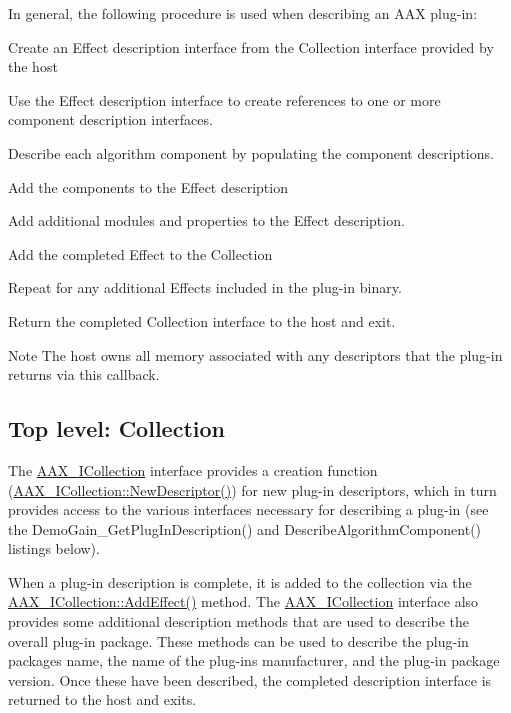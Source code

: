  In general, the following procedure is used when describing an A\+AX plug-\/in\+: 
\begin{DoxyEnumerate}
\item Create an Effect description interface from the Collection interface provided by the host  
\item Use the Effect description interface to create references to one or more component description interfaces.  
\item Describe each algorithm component by populating the component descriptions.  
\item Add the components to the Effect description 
\item Add additional modules and properties to the Effect description.  
\item Add the completed Effect to the Collection  
\item Repeat for any additional Effects included in the plug-\/in binary.  
\item Return the completed Collection interface to the host and exit.  
\end{DoxyEnumerate}

 \begin{DoxyNote}{Note}
The host owns all memory associated with any descriptors that the plug-\/in returns via this callback.
\end{DoxyNote}


 \hypertarget{a00796_describe_collection}{}\subsection{Top level\+: Collection}\label{a00796_describe_collection}
 The \mbox{\hyperlink{a01777}{A\+A\+X\+\_\+\+I\+Collection}} interface provides a creation function (\mbox{\hyperlink{a01777_afab70588134a065a5b4d6ea6ddd5ddff}{A\+A\+X\+\_\+\+I\+Collection\+::\+New\+Descriptor()}}) for new plug-\/in descriptors, which in turn provides access to the various interfaces necessary for describing a plug-\/in (see the {\ttfamily Demo\+Gain\+\_\+\+Get\+Plug\+In\+Description()} and {\ttfamily Describe\+Algorithm\+Component()} listings below).

 When a plug-\/in description is complete, it is added to the collection via the \mbox{\hyperlink{a01777_a5ff114b8c4da2081515186f2faf65c8c}{A\+A\+X\+\_\+\+I\+Collection\+::\+Add\+Effect()}} method. The \mbox{\hyperlink{a01777}{A\+A\+X\+\_\+\+I\+Collection}} interface also provides some additional description methods that are used to describe the overall plug-\/in package. These methods can be used to describe the plug-\/in package\textquotesingle{}s name, the name of the plug-\/in\textquotesingle{}s manufacturer, and the plug-\/in package version. Once these have been described, the completed description interface is returned to the host and exits.


